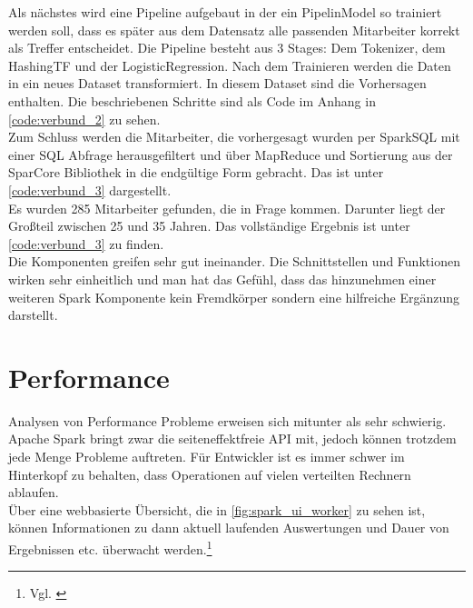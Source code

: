 \noindent
Als nächstes wird eine Pipeline aufgebaut in der ein PipelinModel so trainiert werden soll, dass es später aus dem Datensatz alle passenden Mitarbeiter korrekt als Treffer entscheidet. Die Pipeline besteht aus 3 Stages: Dem Tokenizer, dem HashingTF und der LogisticRegression. Nach dem Trainieren werden die Daten in ein neues Dataset transformiert. In diesem Dataset sind die Vorhersagen enthalten. Die beschriebenen Schritte sind als Code im Anhang in \autoref{code:verbund_2} zu sehen. \\

\noindent
Zum Schluss werden die Mitarbeiter, die vorhergesagt wurden per SparkSQL mit einer SQL Abfrage herausgefiltert und über MapReduce und Sortierung aus der SparCore Bibliothek in die endgültige Form gebracht. Das ist unter \autoref{code:verbund_3} dargestellt. \\

\noindent
Es wurden 285 Mitarbeiter gefunden, die in Frage kommen. Darunter liegt der Großteil zwischen 25 und 35 Jahren. Das vollständige Ergebnis ist unter \autoref{code:verbund_3} zu finden.\\

\noindent
Die Komponenten greifen sehr gut ineinander. Die Schnittstellen und Funktionen wirken sehr einheitlich und man hat das Gefühl, dass das hinzunehmen einer weiteren Spark Komponente kein Fremdkörper sondern eine hilfreiche Ergänzung darstellt.

 




\newpage
\section{Performance}
Analysen von Performance Probleme erweisen sich mitunter als sehr schwierig. Apache Spark bringt zwar die seiteneffektfreie API mit, jedoch können trotzdem jede Menge Probleme auftreten. Für Entwickler ist es immer schwer im Hinterkopf zu behalten, dass Operationen auf vielen verteilten Rechnern ablaufen. \\ 

\noindent
Über eine webbasierte Übersicht, die in \autoref{fig:spark_ui_worker} zu sehen ist, können Informationen zu dann aktuell laufenden Auswertungen und Dauer von Ergebnissen etc. überwacht werden.\footnote{Vgl. \cite[12]{AAWS15}}

